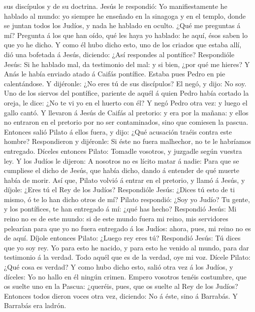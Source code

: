 sus discípulos y de su doctrina.  Jesús le respondió: Yo
manifiestamente he hablado al mundo: yo siempre he enseñado en la
sinagoga y en el templo, donde se juntan todos los Judíos, y nada he
hablado en oculto.  ¿Qué me preguntas á mí? Pregunta á los
que han oído, qué les haya yo hablado: he aquí, ésos saben lo que yo he
dicho.  Y como él hubo dicho esto, uno de los criados que
estaba allí, dió una bofetada á Jesús, diciendo: ¿Así respondes al
pontífice?  Respondióle Jesús: Si he hablado mal, da
testimonio del mal: y si bien, ¿por qué me hieres?  Y Anás
le había enviado atado á Caifás pontífice.  Estaba pues
Pedro en pie calentándose. Y dijéronle: ¿No eres tú de sus discípulos?
El negó, y dijo: No soy.  Uno de los siervos del pontífice,
pariente de aquél á quien Pedro había cortado la oreja, le dice: ¿No te
vi yo en el huerto con él?  Y negó Pedro otra vez: y luego
el gallo cantó.  Y llevaron á Jesús de Caifás al pretorio:
y era por la mañana: y ellos no entraron en el pretorio por no ser
contaminados, sino que comiesen la pascua.  Entonces salió
Pilato á ellos fuera, y dijo: ¿Qué acusación traéis contra este hombre?
 Respondieron y dijéronle: Si éste no fuera malhechor, no
te le habríamos entregado.  Díceles entonces Pilato:
Tomadle vosotros, y juzgadle según vuestra ley. Y los Judíos le dijeron:
A nosotros no es lícito matar á nadie:  Para que se
cumpliese el dicho de Jesús, que había dicho, dando á entender de qué
muerte había de morir.  Así que, Pilato volvió á entrar en
el pretorio, y llamó á Jesús, y díjole: ¿Eres tú el Rey de los Judíos?
 Respondióle Jesús: ¿Dices tú esto de ti mismo, ó te lo han
dicho otros de mí?  Pilato respondió: ¿Soy yo Judío? Tu
gente, y los pontífices, te han entregado á mí: ¿qué has hecho?
 Respondió Jesús: Mi reino no es de este mundo: si de este
mundo fuera mi reino, mis servidores pelearían para que yo no fuera
entregado á los Judíos: ahora, pues, mi reino no es de aquí.
 Díjole entonces Pilato: ¿Luego rey eres tú? Respondió
Jesús: Tú dices que yo soy rey. Yo para esto he nacido, y para esto he
venido al mundo, para dar testimonio á la verdad. Todo aquél que es de
la verdad, oye mi voz.  Dícele Pilato: ¿Qué cosa es verdad?
Y como hubo dicho esto, salió otra vez á los Judíos, y díceles: Yo no
hallo en él ningún crimen.  Empero vosotros tenéis
costumbre, que os suelte uno en la Pascua: ¿queréis, pues, que os suelte
al Rey de los Judíos?  Entonces todos dieron voces otra
vez, diciendo: No á éste, sino á Barrabás. Y Barrabás era ladrón.

